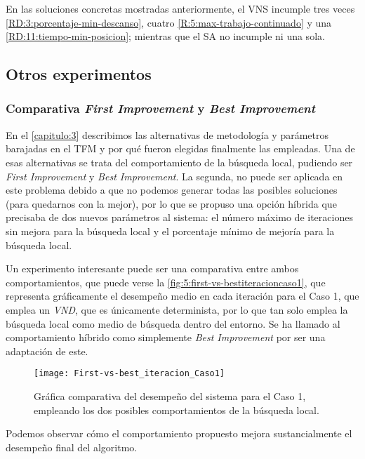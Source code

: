 En las soluciones concretas mostradas anteriormente, el VNS incumple tres veces \ref{RD:3:porcentaje-min-descanso}, cuatro \ref{R:5:max-trabajo-continuado} y una \ref{RD:11:tiempo-min-posicion}; mientras que el SA no incumple ni una sola.

\subsection{Otros experimentos}

\subsubsection{Comparativa \textit{First Improvement} y \textit{Best Improvement}}

En el \autoref{capitulo:3} describimos las alternativas de metodología y parámetros barajadas en el TFM y por qué fueron elegidas finalmente las empleadas. Una de esas alternativas se trata del comportamiento de la búsqueda local, pudiendo ser \textit{First Improvement} y \textit{Best Improvement}. La segunda, no puede ser aplicada en este problema debido a que no podemos generar todas las posibles soluciones (para quedarnos con la mejor), por lo que se propuso una opción híbrida que precisaba de dos nuevos parámetros al sistema: el número máximo de iteraciones sin mejora para la búsqueda local y el porcentaje mínimo de mejoría para la búsqueda local.

Un experimento interesante puede ser una comparativa entre ambos comportamientos, que puede verse la \autoref{fig:5:first-vs-bestiteracioncaso1}, que representa gráficamente el desempeño medio en cada iteración para el Caso 1, que emplea un \textit{VND}, que es únicamente determinista, por lo que tan solo emplea la búsqueda local como medio de búsqueda dentro del entorno. Se ha llamado al comportamiento híbrido como simplemente \textit{Best Improvement} por ser una adaptación de este.

\begin{figure}
	\centering
	\texttt{[image: First-vs-best\_iteracion\_Caso1]}
	\caption{Gráfica comparativa del desempeño del sistema para el Caso 1, empleando los dos posibles comportamientos de la búsqueda local.}
	\label{fig:5:first-vs-bestiteracioncaso1}
\end{figure}

Podemos observar cómo el comportamiento propuesto mejora sustancialmente el desempeño final del algoritmo.